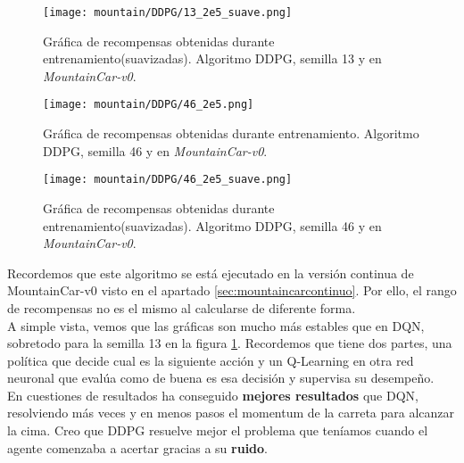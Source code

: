 \documentclass[11pt,fleqn]{book} %
\begin{document}
\begin{figure}[H]
	\centering\texttt{[image: mountain/DDPG/13\_2e5\_suave.png]}
	\caption{Gráfica de recompensas obtenidas durante entrenamiento(suavizadas). Algoritmo DDPG, semilla 13 y en \textit{MountainCar-v0}.}
	\label{fig:mountain16} %
\end{figure}

\begin{figure}[H]
	\centering\texttt{[image: mountain/DDPG/46\_2e5.png]}
	\caption{Gráfica de recompensas obtenidas durante entrenamiento. Algoritmo DDPG, semilla 46 y en \textit{MountainCar-v0}.}
	\label{fig:mountain17} %
\end{figure}

\begin{figure}[H]
	\centering\texttt{[image: mountain/DDPG/46\_2e5\_suave.png]}
	\caption{Gráfica de recompensas obtenidas durante entrenamiento(suavizadas). Algoritmo DDPG, semilla 46 y en \textit{MountainCar-v0}.}
	\label{fig:mountain18} %
\end{figure}

Recordemos que este algoritmo se está ejecutado en la versión continua de MountainCar-v0 visto en el apartado \ref{sec:mountaincarcontinuo}. Por ello, el rango de recompensas no es el mismo al calcularse de diferente forma. \\

A simple vista, vemos que las gráficas son mucho más estables que en DQN, sobretodo para la semilla 13 en la figura \ref{fig:mountain16}. Recordemos que tiene dos partes, una política que decide cual es la siguiente acción y un Q-Learning en otra red neuronal que evalúa como de buena es esa decisión y supervisa su desempeño. \\

En cuestiones de resultados ha conseguido \textbf{mejores resultados} que DQN, resolviendo más veces y en menos pasos el momentum de la carreta para alcanzar la cima. Creo que DDPG resuelve mejor el problema que teníamos cuando el agente comenzaba a acertar gracias a su \textbf{ruido}. \\
\end{document}
